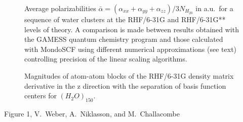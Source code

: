 \documentclass[prl,aps,preprint,showpacs,superbib]{revtex4}
\begin{document}
{\begin{figure}[h]
\caption{\protect Average polarizabilities $\bar{\alpha}=(\alpha_{xx}+\alpha_{yy}+\alpha_{zz})/3N_{H_20}$
         in a.u.~for a sequence of water clusters at the RHF/6-31G and RHF/6-31G** levels of theory.
         A comparison is made between results obtained with the {\sc GAMESS} quantum chemistry program
         \cite{gamess} and those calculated with {\sc MondoSCF} using different numerical approximations
         (see text) controlling precision of the linear scaling algorithms.
}\label{tab:Polari_Values}


\caption{\protect
    Magnitudes of atom-atom blocks of the RHF/6-31G density matrix derivative
    in the z direction with the separation of basis function centers for $(H_2O)_{150}$.
}\label{fig:DPrimeZ_150_6-31G}

\end{figure}

\clearpage

\begin{center}
Figure 1, V.~Weber, A.~Niklasson,  and M.~Challacombe \\[1.cm]
\end{center}

}
\end{document}
